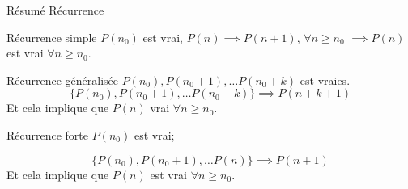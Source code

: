 \begin{parag}{Résumé Récurrence}
    \begin{subparag}{Récurrence simple}
        $P\left(n_0\right)$ est vrai, $P\left(n\right) \implies P\left(n+1\right)$, $\forall n \geq n_0$ $ \implies P\left(n\right)$ est vrai $\forall n \geq n_0$.
    \end{subparag}
    \begin{subparag}{Récurrence généralisée}
        $P\left(n_0\right), P\left(n_0 + 1\right), \ldots P\left(n_0 + k\right)$ est vraies.\\
        \begin{equation*} \{ P\left(n_0\right), P\left(n_0 + 1\right), \ldots P\left(n_0 + k\right)\} \implies P\left(n+k+1\right)\end{equation*}
        Et cela implique que $P\left(n\right)$ vrai $\forall n \geq n_0$.
    \end{subparag}
    \begin{subparag}{Récurrence forte}
        $P\left(n_0\right)$ est vrai; 
        
        \begin{equation*} \{ P\left(n_0\right), P\left(n_0 + 1\right), \ldots P\left(n\right)\} \implies P\left(n+1\right)\end{equation*}
        Et cela implique que $P\left(n\right)$ est vrai $\forall n \geq n_0$.
        
    \end{subparag}
    
\end{parag}




